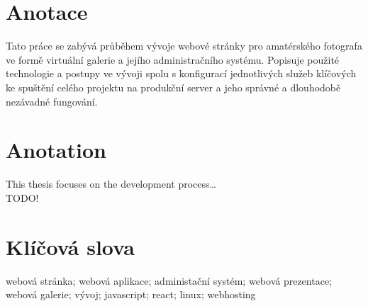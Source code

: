 \documentclass[12pt,a4paper]{report}
\begin{document}
  \section*{Anotace}
  Tato práce se zabývá průběhem vývoje webové stránky pro amatérského 
  fotografa ve formě virtuální galerie a jejího administračního systému.
  Popisuje použité technologie a postupy ve vývoji spolu s konfigurací
  jednotlivých služeb klíčových ke spuštění celého projektu
  na produkční server a jeho správné a dlouhodobě nezávadné fungování.
  
  \section*{Anotation}
  This thesis focuses on the development process\dots \\TODO!

  \section*{Klíčová slova}
  
  \noindent webová stránka; webová aplikace; administační systém; webová prezentace; webová galerie; vývoj; javascript; react; linux; webhosting
  
  \clearpage
  
  \tableofcontents
  
  \clearpage
\end{document}
